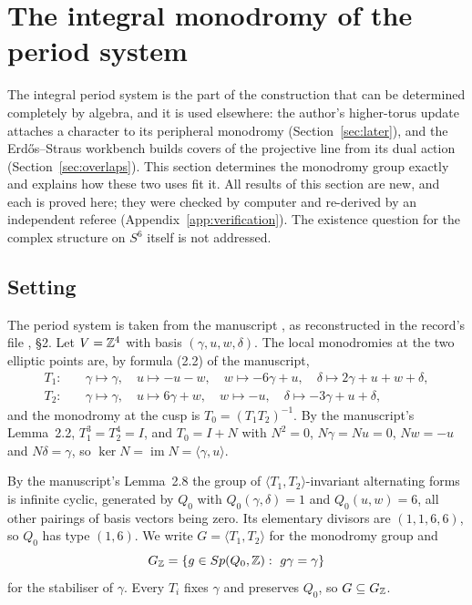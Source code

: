 \section{The integral monodromy of the period system}\label{sec:monodromy}

The integral period system is the part of the construction that can be determined completely by algebra, and it is used elsewhere: the author's higher-torus update attaches a character to its peripheral monodromy (Section~\ref{sec:later}), and the Erdős--Straus workbench builds covers of the projective line from its dual action (Section~\ref{sec:overlaps}). This section determines the monodromy group exactly and explains how these two uses fit it. All results of this section are new, and each is \textsf{proved here}; they were checked by computer and re-derived by an independent referee (Appendix~\ref{app:verification}). The existence question for the complex structure on $S^6$ itself is not addressed.

\subsection{Setting}

The period system is taken from the manuscript \cite{AlpogeS6}, as reconstructed in the record's file , §2. Let $V=\mathbb{Z}^4$ with basis $(\gamma,u,w,\delta)$. The local monodromies at the two elliptic points are, by formula (2.2) of the manuscript,
\begin{align*}
T_1:&\quad \gamma\mapsto\gamma,\quad u\mapsto-u-w,\quad w\mapsto-6\gamma+u,\quad \delta\mapsto2\gamma+u+w+\delta,\\
T_2:&\quad \gamma\mapsto\gamma,\quad u\mapsto6\gamma+w,\quad w\mapsto-u,\quad \delta\mapsto-3\gamma+u+\delta,
\end{align*}
and the monodromy at the cusp is $T_0=(T_1T_2)^{-1}$. By the manuscript's Lemma~2.2, $T_1^3=T_2^4=I$, and $T_0=I+N$ with $N^2=0$, $N\gamma=Nu=0$, $Nw=-u$ and $N\delta=\gamma$, so $\ker N=\operatorname{im}N=\langle\gamma,u\rangle$.

By the manuscript's Lemma~2.8 the group of $\langle T_1,T_2\rangle$-invariant alternating forms is infinite cyclic, generated by $Q_0$ with $Q_0(\gamma,\delta)=1$ and $Q_0(u,w)=6$, all other pairings of basis vectors being zero. Its elementary divisors are $(1,1,6,6)$, so $Q_0$ has type $(1,6)$. We write $G=\langle T_1,T_2\rangle$ for the monodromy group and
\[
G_{\mathbb{Z}}=\{g\in Sp(Q_0,\mathbb{Z}):\ g\gamma=\gamma\}
\]
for the stabiliser of $\gamma$. Every $T_i$ fixes $\gamma$ and preserves $Q_0$, so $G\subseteq G_{\mathbb{Z}}$.


